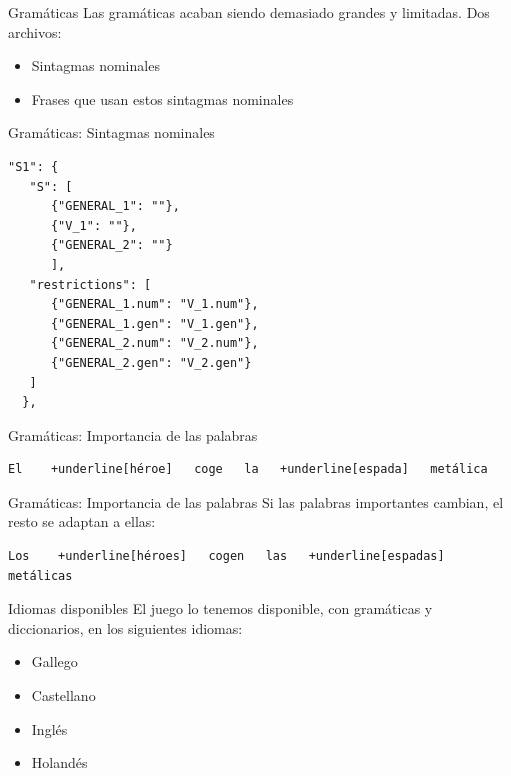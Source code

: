 \begin{frame}[t, fragile]{Gramáticas}
	Las gramáticas acaban siendo demasiado grandes y limitadas. Dos archivos:
	\begin{itemize}
		\item Sintagmas nominales
		\item<+-| alert@+> Frases que usan estos sintagmas nominales
	\end{itemize}
\end{frame}

\begin{frame}[t, fragile]{Gramáticas: Sintagmas nominales}
	\begin{Verbatim}
"S1": {
   "S": [
      {"GENERAL_1": ""},
      {"V_1": ""},
      {"GENERAL_2": ""}
      ],
   "restrictions": [
      {"GENERAL_1.num": "V_1.num"},
      {"GENERAL_1.gen": "V_1.gen"},
      {"GENERAL_2.num": "V_2.num"},
      {"GENERAL_2.gen": "V_2.gen"}
   ]
  },
	\end{Verbatim}
\end{frame}

\begin{frame}[t, fragile]{Gramáticas: Importancia de las palabras}
	\vspace*{\fill}
		\begin{Verbatim}[commandchars=+\[\]]
	El    +underline[héroe]   coge   la   +underline[espada]   metálica
		\end{Verbatim}
	\vspace*{\fill}
\end{frame}

\begin{frame}[t, fragile]{Gramáticas: Importancia de las palabras}
	Si las palabras importantes cambian, el resto se adaptan a ellas:
	\vspace*{\fill}
		\begin{Verbatim}[commandchars=+\[\]]
	Los    +underline[héroes]   cogen   las   +underline[espadas]   metálicas
		\end{Verbatim}
	\vspace*{\fill}
\end{frame}


\begin{frame}[t, fragile]{Idiomas disponibles}
	El juego lo tenemos disponible, con gramáticas y diccionarios, en los siguientes idiomas:
	\begin{itemize}
		\item Gallego
		\item Castellano
		\item Inglés
		\item Holandés
	\end{itemize}
\end{frame}

